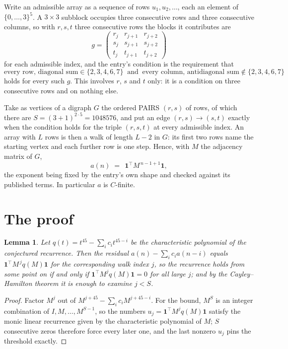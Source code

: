 \documentclass[11pt,a4paper]{article}
\theoremstyle{plain}
\newtheorem{lemma}[theorem]{Lemma}
\theoremstyle{definition}
\begin{document}
Write an admissible array as a sequence of rows $u_1,u_2,\dots$, each an element of
$\{0,\dots,3\}^{5}$. A $3\times3$ subblock occupies three consecutive rows and
three consecutive columns, so with $r,s,t$ three consecutive rows the blocks it
contributes are
\[
g=\begin{pmatrix}r_j&r_{j+1}&r_{j+2}\\ s_j&s_{j+1}&s_{j+2}\\ t_j&t_{j+1}&t_{j+2}\end{pmatrix}
\]
for each admissible index, and the entry's condition is the requirement that
\[
\text{every row, diagonal sum} \in \{2,3,4,6,7\}\ \text{ and }\ \text{every column, antidiagonal sum} \notin \{2,3,4,6,7\}
\]
holds for every such $g$. This involves $r$, $s$ and $t$ only: it is a condition on
three consecutive rows and on nothing else.

Take as vertices of a digraph $G$ the ordered PAIRS $(r,s)$ of rows, of which there are
$S=(3+1)^{2\cdot5}=1048576$, and put an edge $(r,s)\to(s,t)$ exactly when the condition
holds for the triple $(r,s,t)$ at every admissible index. An array with $L$ rows is then a
walk of length $L-2$ in $G$: its first two rows name the starting vertex and each further
row is one step. Hence, with $M$ the adjacency matrix of $G$,
\[
a(n)\;=\;\,\mathbf{1}^{\!\top}M^{\,n-1+1}\mathbf{1},
\]
the exponent being fixed by the entry's own shape and checked against its published terms.
In particular $a$ is $C$-finite.

\section{The proof}

\begin{lemma}\label{lem:crit}
Let $q(t)=t^{45}-\sum_i c_it^{45-i}$ be the characteristic polynomial of the
conjectured recurrence. Then the residual $a(n)-\sum_ic_ia(n-i)$ equals
$\mathbf{1}^{\!\top}M^{\,j}q(M)\mathbf{1}$ for the corresponding walk index
$j$, so the recurrence holds from some point on if and only if
$\mathbf{1}^{\!\top}M^{j}q(M)\mathbf{1}=0$ for all large $j$; and by the
Cayley--Hamilton theorem it is enough to examine $j<S$.
\end{lemma}

\begin{proof}
Factor $M^{j}$ out of $M^{j+45}-\sum_ic_iM^{j+45-i}$. For the bound, $M^{S}$
is an integer combination of $I,M,\dots,M^{S-1}$, so the numbers
$u_j=\mathbf{1}^{\!\top}M^{j}q(M)\mathbf{1}$ satisfy the monic linear recurrence given by
the characteristic polynomial of $M$; $S$ consecutive zeros therefore force every later one,
and the last nonzero $u_j$ pins the threshold exactly.
\end{proof}
\end{document}
